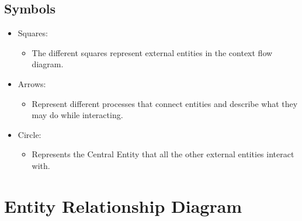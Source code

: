 \documentclass{article}
\begin{document}
\subsection{Symbols}
\begin{itemize}
\item Squares: \begin{itemize}
        \item The different squares represent external entities in the context flow diagram.
    \end{itemize}
\end{itemize}

\begin{itemize}
\item Arrows: \begin{itemize}
        \item Represent different processes that connect entities and describe what they may do while interacting.
    \end{itemize}
\end{itemize}

\begin{itemize}
\item Circle:
    \begin{itemize}
        \item Represents the Central Entity that all the other external entities interact with.
    \end{itemize}
\end{itemize}

\section{Entity Relationship Diagram}
\end{document}

